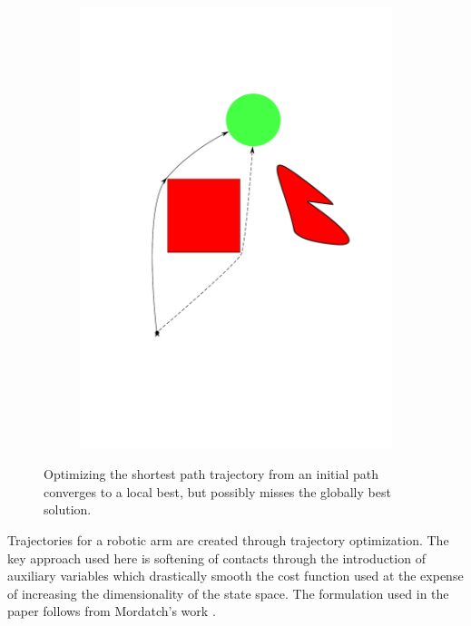 \documentclass[../thesis.tex]{subfiles}
\begin{document}
\begin{figure}
\begin{subfigure}[b]{0.24\linewidth}
    \includegraphics[width=\linewidth]{./Planning/trajectory_best.pdf}    
  \end{subfigure}
  
  \caption{Optimizing the shortest path trajectory from an initial path converges to a local best, but possibly misses the globally best solution.}
  \label{fig:TrajectoryOptimization}
\end{figure}


Trajectories for a robotic arm are created through trajectory optimization. The key approach used here is softening of contacts through the introduction of auxiliary variables which drastically smooth the cost function used at the expense of increasing the dimensionality of the state space. The formulation used in the paper follows from Mordatch's work \cite{Mordatch2012}.
\end{document}
